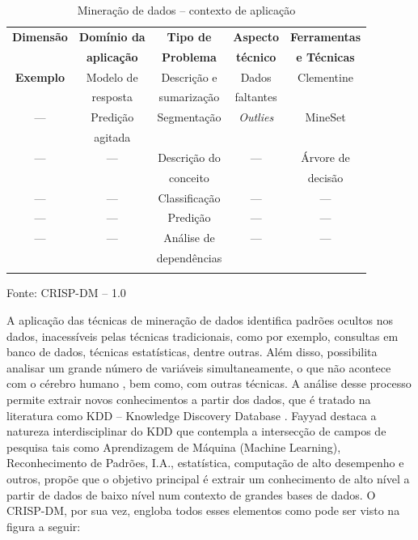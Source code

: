 \begin{table}[!ht]

\caption{Mineração de dados -- contexto de aplicação \cite{Crisp2000}}
\vspace{1mm}
\centering
\begin{tabular}{c|c|c|c|c}
\textbf{Dimensão} & \textbf{Domínio da} & \textbf{Tipo de } & \textbf{Aspecto } & \textbf{Ferramentas } \\
		  & \textbf{aplicação}  & \textbf{Problema} & \textbf{técnico}  & \textbf{e Técnicas}   \\ \hline
\textbf{Exemplo}  & Modelo de           & Descrição e       & Dados             & Clementine  \\
                  & resposta            & sumarização       & faltantes         &             \\ \hline
      --- 	  & Predição            & Segmentação       & \textit{Outlies}  & MineSet     \\
         	  & agitada             &                   &                   &             \\ \hline
      ---         & ---                 & Descrição do      & ---               & Árvore de   \\
                  &                     & conceito          &                   & decisão     \\ \hline
      ---         & ---                 & Classificação     & ---               & ---         \\ \hline
      ---         & ---                 & Predição          & ---               & ---         \\ \hline
      ---         & ---                 & Análise de        & ---               & ---         \\
                  &                     & dependências      &                   & \\            
\\
\end{tabular}
\tiny Fonte: CRISP-DM -- 1.0
\end{table}


A aplicação das técnicas de mineração de dados identifica padrões ocultos nos dados, inacessíveis pelas técnicas tradicionais,
como por exemplo, consultas em banco de dados, técnicas estatísticas, dentre outras. Além disso, possibilita analisar um grande número de 
variáveis simultaneamente, o que não acontece com o cérebro humano \cite{possas1998data}, bem como, com outras técnicas. 
A análise desse processo permite extrair novos conhecimentos a partir dos dados, que é tratado na literatura como 
KDD -- Knowledge Discovery Database \cite{FayyadUeoutros}. Fayyad destaca a natureza interdisciplinar do KDD que contempla a intersecção 
de campos de pesquisa tais como Aprendizagem de Máquina (Machine Learning), Reconhecimento de Padrões, I.A., estatística, computação de alto 
desempenho e outros, propõe que o objetivo principal é extrair um conhecimento de alto nível a partir de dados de baixo nível num contexto de 
grandes bases de dados.
O CRISP-DM, por sua vez, engloba todos esses elementos como pode ser visto na figura a seguir:

